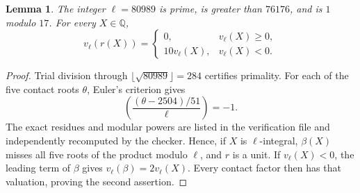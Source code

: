 \documentclass[11pt,a4paper]{article}
\newtheorem{lemma}[theorem]{Lemma}
\theoremstyle{definition}\newtheorem{definition}[theorem]{Definition}
\theoremstyle{remark}\newtheorem{remark}[theorem]{Remark}
\newcommand{\Q}{\mathbb Q}\newcommand{\Z}{\mathbb Z}
\begin{document}
\begin{lemma}\label{lem:prime}
The integer $\ell=80989$ is prime, is greater than $76176$, and is
$1$ modulo $17$. For every $X\in\Q$,
\[
 v_\ell(r(X))=
 \begin{cases}0,&v_\ell(X)\ge0,\\10v_\ell(X),&v_\ell(X)<0.
 \end{cases}
\]
\end{lemma}
\begin{proof}
Trial division through $\lfloor\sqrt{80989}\rfloor=284$ certifies
primality. For each of the five contact roots $\theta$, Euler's criterion gives
\[
 \left(\frac{(\theta-2504)/51}{\ell}\right)=-1.
\]
The exact residues and modular powers are listed in the verification
file and independently recomputed by the checker. Hence, if $X$ is
$\ell$-integral, $\beta(X)$ misses all five roots of the product
modulo $\ell$, and $r$ is a unit. If $v_\ell(X)<0$, the leading term
of $\beta$ gives $v_\ell(\beta)=2v_\ell(X)$. Every contact factor
then has that valuation, proving the second assertion.
\end{proof}
\end{document}
